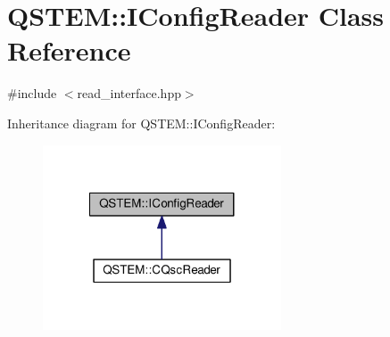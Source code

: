 \hypertarget{class_q_s_t_e_m_1_1_i_config_reader}{\section{Q\-S\-T\-E\-M\-:\-:I\-Config\-Reader Class Reference}
\label{class_q_s_t_e_m_1_1_i_config_reader}
}


{\ttfamily \#include $<$read\-\_\-interface.\-hpp$>$}



Inheritance diagram for Q\-S\-T\-E\-M\-:\-:I\-Config\-Reader\-:
\nopagebreak
\begin{figure}[H]
\begin{center}
\leavevmode
\includegraphics[width=200pt]{class_q_s_t_e_m_1_1_i_config_reader__inherit__graph}
\end{center}
\end{figure}
